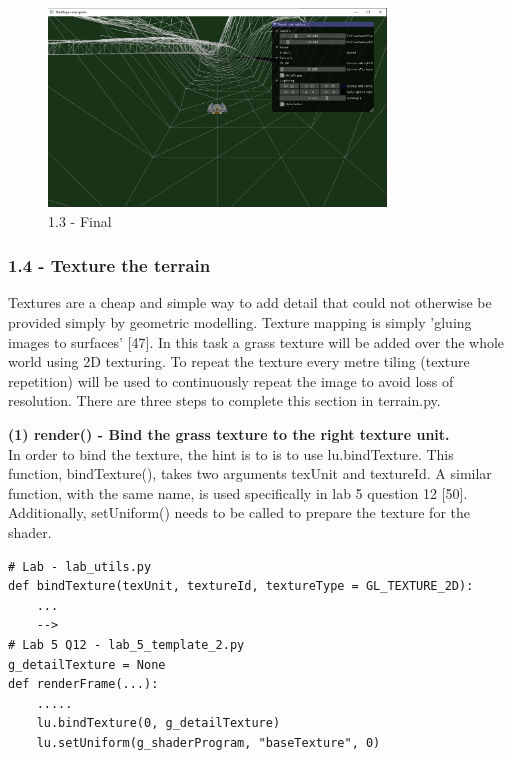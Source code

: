 \documentclass[a4 paper, 12pt]{article}
\begin{document}
\begin{figure} [H]
    \centering
    \includegraphics[width=0.8\textwidth, frame]
        {./images/mega_racer/1.3_b.PNG}
    \caption{1.3 - Final}
\end{figure}

\subsubsection{1.4 - Texture the terrain}
Textures are a cheap and simple way to add detail that could not otherwise be provided simply by geometric modelling. Texture mapping is simply 'gluing images to surfaces' [47]. In this task a grass texture will be added over the whole world using 2D texturing. To repeat the texture every metre tiling (texture repetition) will be used to continuously repeat the image to avoid loss of resolution. There are three steps to complete this section in terrain.py. 

\textbf{(1) render() - Bind the grass texture to the right texture unit.} \\ 
In order to bind the texture, the hint is to is to use lu.bindTexture. This function, bindTexture(), takes two arguments texUnit and textureId. A similar function, with the same name, is used specifically in lab 5 question 12 [50]. Additionally, setUniform() needs to be called to prepare the texture for the shader. 
    \begin{lstlisting}
# Lab - lab_utils.py 
def bindTexture(texUnit, textureId, textureType = GL_TEXTURE_2D):
    ...
    -->
# Lab 5 Q12 - lab_5_template_2.py
g_detailTexture = None
def renderFrame(...):
    .....
    lu.bindTexture(0, g_detailTexture)
    lu.setUniform(g_shaderProgram, "baseTexture", 0)
    \end{lstlisting}
\end{document}
